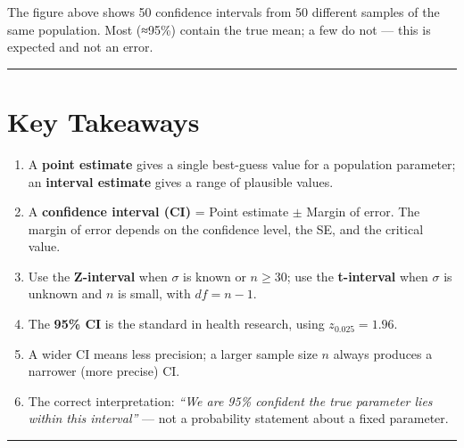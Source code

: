 \documentclass[
  12pt,
  letterpaper,
]{book}
\begin{document}
The figure above shows 50 confidence intervals from 50 different samples
of the same population. Most (≈95\%) contain the true mean; a few do not
--- this is expected and not an error.

\begin{center}\rule{0.5\linewidth}{0.5pt}\end{center}


\chapter{Key Takeaways}\label{key-takeaways-3}

\begin{tcolorbox}[enhanced jigsaw, arc=.35mm, bottomrule=.15mm, bottomtitle=1mm, breakable, colback=white, colbacktitle=quarto-callout-note-color!10!white, colframe=quarto-callout-note-color-frame, coltitle=black, left=2mm, leftrule=.75mm, opacityback=0, opacitybacktitle=0.6, rightrule=.15mm, title={📝 Chapter 4 Summary}, titlerule=0mm, toprule=.15mm, toptitle=1mm]

\begin{enumerate}
\def\labelenumi{\arabic{enumi}.}
\item
  A \textbf{point estimate} gives a single best-guess value for a
  population parameter; an \textbf{interval estimate} gives a range of
  plausible values.
\item
  A \textbf{confidence interval (CI)} = Point estimate \(\pm\) Margin of
  error. The margin of error depends on the confidence level, the SE,
  and the critical value.
\item
  Use the \textbf{Z-interval} when \(\sigma\) is known or \(n \geq 30\);
  use the \textbf{t-interval} when \(\sigma\) is unknown and \(n\) is
  small, with \(df = n - 1\).
\item
  The \textbf{95\% CI} is the standard in health research, using
  \(z_{0.025} = 1.96\).
\item
  A wider CI means less precision; a larger sample size \(n\) always
  produces a narrower (more precise) CI.
\item
  The correct interpretation: \emph{``We are 95\% confident the true
  parameter lies within this interval''} --- not a probability statement
  about a fixed parameter.
\end{enumerate}

\end{tcolorbox}

\begin{center}\rule{0.5\linewidth}{0.5pt}\end{center}
\end{document}
